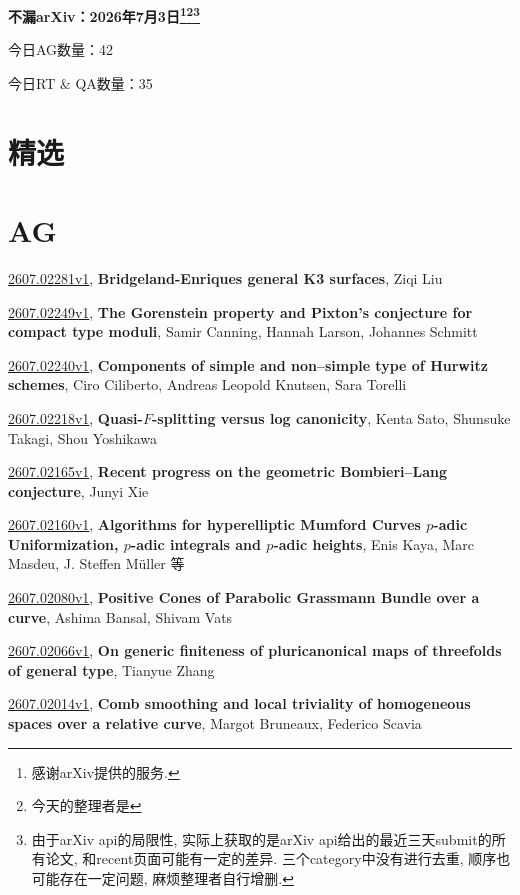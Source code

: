 \documentclass[9pt, a4paper]{article}
\theoremstyle{plain}
\theoremstyle{definition}
\theoremstyle{remark}
\newcommand{\arxiv}[3]{\href{https://arxiv.org/abs/#1}{#1}, \textbf{\textcolor{arxivblue}{#2}}, #3}
\newcommand{\AGnumber}{42}
\newcommand{\RTQAnumber}{35}
\newcommand{\NewestDate}{2026年7月3日}
\newcommand{\todayarXiver}{} %
\begin{document}
\begin{center}
    \Huge\textbf{不漏arXiv：\NewestDate\footnote{感谢arXiv提供的服务.}\footnote{今天的整理者是\todayarXiver}\footnote{由于arXiv api的局限性, 实际上获取的是arXiv api给出的最近三天submit的所有论文, 和recent页面可能有一定的差异. 三个category中没有进行去重, 顺序也可能存在一定问题, 麻烦整理者自行增删.}} \\
\end{center}

\setcounter{section}{-1}

\begin{center}
    今日AG数量：\AGnumber
    
    今日RT \& QA数量：\RTQAnumber
    
\end{center}


\section{精选}


\section{AG}
\arxiv{2607.02281v1}{Bridgeland-Enriques general K3 surfaces}{Ziqi Liu}

\arxiv{2607.02249v1}{The Gorenstein property and Pixton's conjecture for compact type moduli}{Samir Canning, Hannah Larson, Johannes Schmitt}

\arxiv{2607.02240v1}{Components of simple and non--simple type of Hurwitz schemes}{Ciro Ciliberto, Andreas Leopold Knutsen, Sara Torelli}

\arxiv{2607.02218v1}{Quasi-$F$-splitting versus log canonicity}{Kenta Sato, Shunsuke Takagi, Shou Yoshikawa}

\arxiv{2607.02165v1}{Recent progress on the geometric Bombieri--Lang conjecture}{Junyi Xie}

\arxiv{2607.02160v1}{Algorithms for hyperelliptic Mumford Curves $p$-adic Uniformization, $p$-adic integrals and $p$-adic heights}{Enis Kaya, Marc Masdeu, J. Steffen Müller 等}

\arxiv{2607.02080v1}{Positive Cones of Parabolic Grassmann Bundle over a curve}{Ashima Bansal, Shivam Vats}

\arxiv{2607.02066v1}{On generic finiteness of pluricanonical maps of threefolds of general type}{Tianyue Zhang}

\arxiv{2607.02014v1}{Comb smoothing and local triviality of homogeneous spaces over a relative curve}{Margot Bruneaux, Federico Scavia}
\end{document}
